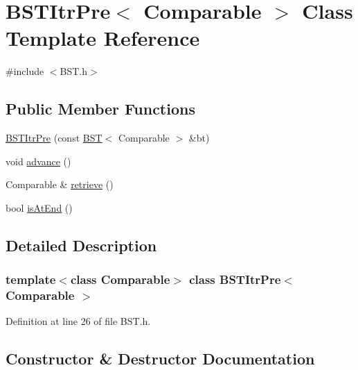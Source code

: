 \hypertarget{class_b_s_t_itr_pre}{}\section{B\+S\+T\+Itr\+Pre$<$ Comparable $>$ Class Template Reference}
\label{class_b_s_t_itr_pre}


{\ttfamily \#include $<$B\+S\+T.\+h$>$}

\subsection*{Public Member Functions}
\begin{DoxyCompactItemize}
\item 
\hyperlink{class_b_s_t_itr_pre_a11b1cd4e783f153b9c1b64ce2ec8077e}{B\+S\+T\+Itr\+Pre} (const \hyperlink{class_b_s_t}{B\+ST}$<$ Comparable $>$ \&bt)
\item 
void \hyperlink{class_b_s_t_itr_pre_a7a743d66a842018fd833fb2b0737254d}{advance} ()
\item 
Comparable \& \hyperlink{class_b_s_t_itr_pre_af40033e97f63bf025c2e33a9fdce4c43}{retrieve} ()
\item 
bool \hyperlink{class_b_s_t_itr_pre_ae282a7b9ffa9d250bb0f6a6d79f6e8d0}{is\+At\+End} ()
\end{DoxyCompactItemize}


\subsection{Detailed Description}
\subsubsection*{template$<$class Comparable$>$\newline
class B\+S\+T\+Itr\+Pre$<$ Comparable $>$}



Definition at line 26 of file B\+S\+T.\+h.



\subsection{Constructor \& Destructor Documentation}
\hypertarget{class_b_s_t_itr_pre_a11b1cd4e783f153b9c1b64ce2ec8077e}{}\label{class_b_s_t_itr_pre_a11b1cd4e783f153b9c1b64ce2ec8077e} 
